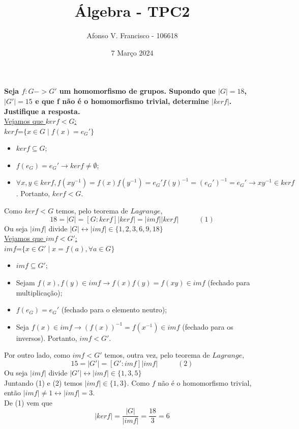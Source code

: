 \documentclass{article}
\title{Álgebra - TPC2}
\author{Afonso V. Francisco - 106618 }
\date{7 Março 2024}
\begin{document}
\maketitle

\textbf{Seja $f: G -> G'$ um homomorfismo de grupos. Supondo que $|G|=18$, $|G'|=15$ e que f não é o homomorfismo trivial, determine $|ker f|$. Justifique a resposta.}\\

\underline{Vejamos que $ker f < G$:}\\
$ker f$=$\{x \in G \mid f(x)=e_G'\}$
\begin{itemize}
    \item $ker f \subseteq G$;
    \item $f(e_G)=e_G'\rightarrow ker f \neq \emptyset $;
    \item $\forall{x,y \in ker f}, f(xy^{-1})=f(x)f(y^{-1})=e_G'{f(y)}^{-1}=(e_G')^{-1}=e_G' \rightarrow xy^{-1} \in ker f$.
Portanto, $ker f < G$.
\end{itemize}


Como $ker f < G$ temos, pelo teorema de $Lagrange$,
$$18=|G|=[G:ker f]|ker f|=|im f||ker f| \;\; \; \; \; \; \;\; \; \;   (1) $$ Ou seja $|im f|$ divide $|G| \leftrightarrow |im f| \in \{1,2,3,6,9,18\} $ \\


\underline{Vejamos que $im f < G'$:}\\
$im f$=$\{x \in G' \mid x=f(a), \forall{a \in G}\}$
\begin{itemize}
    \item $im f \subseteq G'$;
    \item Sejam $f(x),f(y) \in im f \rightarrow f(x)f(y)=f(xy) \in im f$ (fechado para multiplicação);
    \item $f(e_G)=e_G'$ (fechado para o elemento neutro);
    \item Seja $f(x) \in im f \rightarrow (f(x))^{-1}=f(x^{-1}) \in im f$ (fechado para os inversos).
Portanto, $im f < G'$.
\end{itemize}



Por outro lado, como $im f < G'$ temos, outra vez, pelo teorema de $Lagrange$, 
$$15=|G'|=[G':im f]|im f|\;\; \; \; \; \; \;\; \; \;   (2)$$ Ou seja $|im f|$ divide $|G'| \leftrightarrow |im f| \in \{1,3,5\}$\\
Juntando (1) e (2) temos $|im f| \in \{1,3\}$. Como $f$ não é o homomorfismo trivial, então $|im f| \neq1 \leftrightarrow |im f|=3$.\\
De (1) vem que $$|ker f|=\frac{|G|}{|im f|}= \frac{18}{3}=6$$
\end{document}
